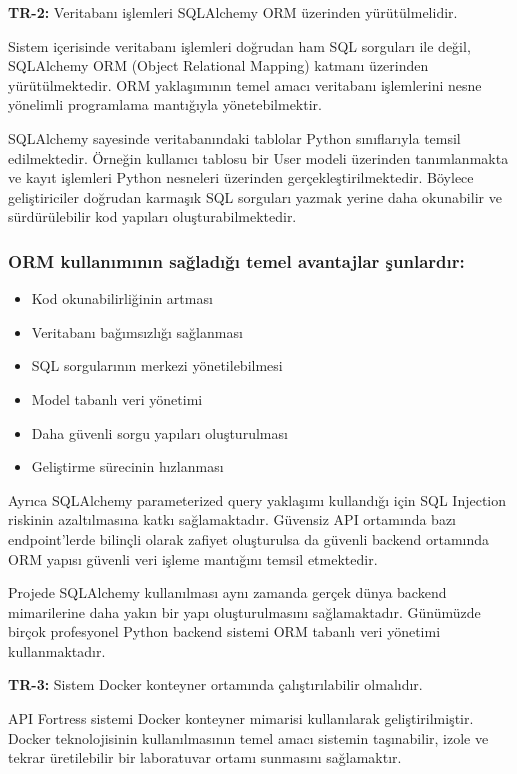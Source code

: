 \noindent\textbf{TR-2:} Veritabanı işlemleri SQLAlchemy ORM üzerinden yürütülmelidir.

Sistem içerisinde veritabanı işlemleri doğrudan ham SQL sorguları ile değil, SQLAlchemy ORM (Object Relational Mapping) katmanı üzerinden yürütülmektedir. ORM yaklaşımının temel amacı veritabanı işlemlerini nesne yönelimli programlama mantığıyla yönetebilmektir.

SQLAlchemy sayesinde veritabanındaki tablolar Python sınıflarıyla temsil edilmektedir. Örneğin kullanıcı tablosu bir User modeli üzerinden tanımlanmakta ve kayıt işlemleri Python nesneleri üzerinden gerçekleştirilmektedir. Böylece geliştiriciler doğrudan karmaşık SQL sorguları yazmak yerine daha okunabilir ve sürdürülebilir kod yapıları oluşturabilmektedir.

\subsubsection{ORM kullanımının sağladığı temel avantajlar şunlardır:}

\begin{itemize}[leftmargin=*]
    \item Kod okunabilirliğinin artması
    \item Veritabanı bağımsızlığı sağlanması
    \item SQL sorgularının merkezi yönetilebilmesi
    \item Model tabanlı veri yönetimi
    \item Daha güvenli sorgu yapıları oluşturulması
    \item Geliştirme sürecinin hızlanması
\end{itemize}

Ayrıca SQLAlchemy parameterized query yaklaşımı kullandığı için SQL Injection riskinin azaltılmasına katkı sağlamaktadır. Güvensiz API ortamında bazı endpoint’lerde bilinçli olarak zafiyet oluşturulsa da güvenli backend ortamında ORM yapısı güvenli veri işleme mantığını temsil etmektedir.

Projede SQLAlchemy kullanılması aynı zamanda gerçek dünya backend mimarilerine daha yakın bir yapı oluşturulmasını sağlamaktadır. Günümüzde birçok profesyonel Python backend sistemi ORM tabanlı veri yönetimi kullanmaktadır.

\noindent\textbf{TR-3:} Sistem Docker konteyner ortamında çalıştırılabilir olmalıdır.

API Fortress sistemi Docker konteyner mimarisi kullanılarak geliştirilmiştir. Docker teknolojisinin kullanılmasının temel amacı sistemin taşınabilir, izole ve tekrar üretilebilir bir laboratuvar ortamı sunmasını sağlamaktır.

